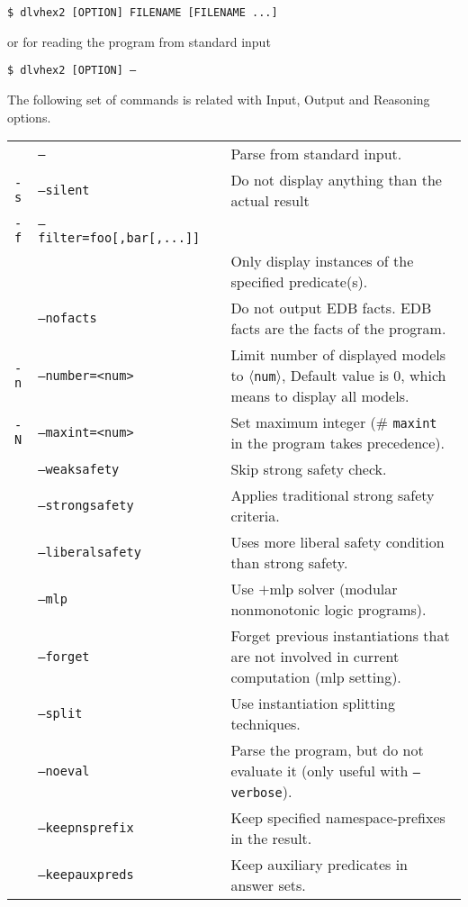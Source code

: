 \documentclass[a4paper, titlepage]{article}
\newcommand\leftaligned[1]{\par \smallskip \noindent \qquad #1 \smallskip \par}
\begin{document}
\leftaligned{\texttt{\$ dlvhex2 [OPTION] FILENAME [FILENAME ...]}}
\noindent
or for reading the program from standard input
\leftaligned{\texttt{\$ dlvhex2 [OPTION] --}}

The following set of commands is related with Input, Output and  Reasoning options.
\renewcommand{\arraystretch}{1.4}
\begin{longtable}{ p{2.0em} p{2.2cm} p{0.6cm} p{8.0cm} } 
 & \texttt{--}& & Parse from standard input. \\ 
\texttt{-s} & \texttt{--silent}&& Do not display anything than the actual result \\ 
\texttt{-f} & \texttt{--filter=foo[,bar[,...]]} && \\
& & & Only display instances of the specified predicate(s).\\
& \texttt{--nofacts} && Do not output EDB facts. EDB facts are the facts of the program.  \\
\texttt{-n} & \texttt{--number=<num>} && Limit number of displayed models to $\langle$\texttt{num}$\rangle$, Default value is 0, which means to display all models.\\ 
\texttt{-N} & \texttt{--maxint=<num>} && Set maximum integer (\# \texttt{maxint} in the program takes precedence). \\
 & \texttt{--weaksafety} && Skip strong safety check.\\
 & \texttt{--strongsafety} && Applies traditional strong safety criteria. \\
  & \texttt{--liberalsafety} && Uses more liberal safety condition than strong safety. \\
  &\texttt{--mlp}&& Use \dlvhex{}$+$mlp solver (modular nonmonotonic logic programs).\\
  & \texttt{--forget} && Forget previous instantiations that are not involved in current computation (mlp setting). \\
  & \texttt{--split} &&Use instantiation splitting techniques.\\
  & \texttt{--noeval} && Parse the program, but do not evaluate it (only useful with \texttt{--verbose}). \\
  & \texttt{--keepnsprefix} && Keep specified namespace-prefixes in the result. \\
  & \texttt{--keepauxpreds} && Keep auxiliary predicates in answer sets. \\
\end{longtable}
\bigskip
\end{document}
